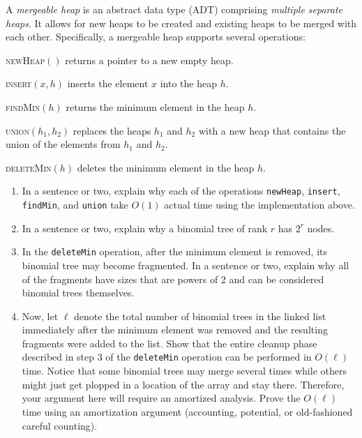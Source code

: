 \documentclass[12 pt, letterpaper]{hmcpset}
\begin{document}
\begin{problem}
	A \emph{mergeable heap} is an abstract data type (ADT) comprising \emph{multiple separate heaps}. It allows for new heaps to be created and existing heaps to be merged with each other. Specifically, a mergeable heap supports several operations:
\begin{description}
    \item \textsc{newHeap}$()$ returns a pointer to a new empty heap.
    \item \textsc{insert}$(x, h)$ inserts the element $x$ into the heap $h$.
    \item \textsc{findMin}$(h)$ returns the minimum element in the heap $h$.
    \item \textsc{union}$(h_1, h_2)$ replaces the heaps $h_1$ and $h_2$ with a new heap that contains the union of the elements from $h_1$ and $h_2$.
    \item \textsc{deleteMin}$(h)$ deletes the minimum element in the heap $h$.
\end{description}

\begin{enumerate}
    \item In a sentence or two, explain why each of the operations \verb+newHeap+, \verb+insert+, \verb+findMin+, and \verb+union+ take $O(1)$ actual time using the implementation above.
	
  \item In a sentence or two, explain why a binomial tree of rank $r$ has $2^r$ nodes. 
	
  \item In the \verb+deleteMin+ operation, after the minimum element is removed,
 its binomial tree may become fragmented. In a sentence or two, explain why all of the fragments have sizes that are powers of 2 and can be considered binomial trees
 themselves.
	
  \item Now, let $\ell$ denote the total  number of binomial trees in the linked
list immediately after the minimum element was removed and the resulting
fragments were added to the list.  Show that the entire cleanup phase described
in step 3 of the \verb+deleteMin+ operation can be performed in $O(\ell)$ time.
Notice that some binomial trees may merge several times while others might just
get plopped in a location of the array and stay there.  Therefore, your argument
here will require an amortized analysis.  Prove the $O(\ell)$ time using an amortization argument (accounting, potential, or old-fashioned careful counting).
	

\end{enumerate}
\end{problem}
\end{document}
